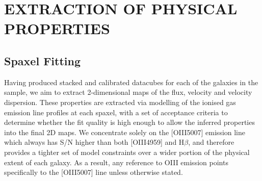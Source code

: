 \documentclass[a4paper,fleqn,usenatbib]{mn2e}
\begin{document}
\section{EXTRACTION OF PHYSICAL PROPERTIES}\label{sec:extracting_properties}
\subsection{Spaxel Fitting}
Having produced stacked and calibrated datacubes for each of the galaxies in the sample, we aim to extract 2-dimensional maps of the flux, velocity and velocity dispersion.
These properties are extracted via modelling of the ionised gas emission line profiles at each spaxel, with a set of acceptance criteria to determine whether the fit quality is high enough to allow the inferred properties into the final 2D maps.
We concentrate solely on the [OIII5007] emission line which always has S/N higher than both [OIII4959] and H$\beta$, and therefore provides a tighter set of model constraints over a wider portion of the physical extent of each galaxy.
As a result, any reference to OIII emission points specifically to the [OIII5007] line unless otherwise stated.
\end{document}
